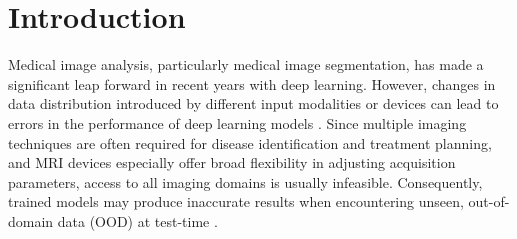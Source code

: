 \section{Introduction}
\label{sec:introduction_dgtta}

    Medical image analysis, particularly medical image segmentation, has made a significant leap forward in recent years with deep learning. However, changes in data distribution introduced by different input modalities or devices can lead to errors in the performance of deep learning models \citep{karani2018lifelong}. Since multiple imaging techniques are often required for disease identification and treatment planning, and MRI devices especially offer broad flexibility in adjusting acquisition parameters, access to all imaging domains is usually infeasible. Consequently, trained models may produce inaccurate results when encountering unseen, out-of-domain data (OOD) at test-time  \citep{pooch2020can}.

